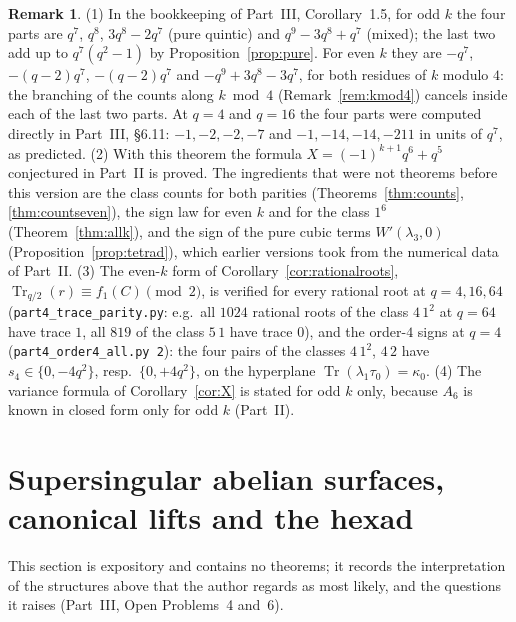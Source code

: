 \documentclass[12pt,a4paper]{amsart}
\theoremstyle{definition}
\newtheorem{remark}[theorem]{Remark}
\newcommand{\Tr}{\operatorname{Tr}}
\begin{document}
\begin{remark}
(1) In the bookkeeping of Part~III, Corollary~1.5, for odd $k$ the four parts are $q^7$, $q^8$, $3q^8-2q^7$ (pure quintic) and $q^9-3q^8+q^7$ (mixed); the last two add up to $q^7(q^2-1)$ by Proposition~\ref{prop:pure}. For even $k$ they are $-q^7$, $-(q-2)q^7$, $-(q-2)q^7$ and $-q^9+3q^8-3q^7$, for both residues of $k$ modulo $4$: the branching of the counts along $k\bmod4$ (Remark~\ref{rem:kmod4}) cancels inside each of the last two parts. At $q=4$ and $q=16$ the four parts were computed directly in Part~III, \S6.11: $-1,-2,-2,-7$ and $-1,-14,-14,-211$ in units of $q^7$, as predicted. (2) With this theorem the formula $X=(-1)^{k+1}q^6+q^5$ conjectured in Part~II is proved. The ingredients that were not theorems before this version are the class counts for both parities (Theorems~\ref{thm:counts}, \ref{thm:countseven}), the sign law for even $k$ and for the class $1^6$ (Theorem~\ref{thm:allk}), and the sign of the pure cubic terms $W'(\lambda_3,0)$ (Proposition~\ref{prop:tetrad}), which earlier versions took from the numerical data of Part~II. (3) The even-$k$ form of Corollary~\ref{cor:rationalroots}, $\Tr_{q/2}(r)\equiv f_1(C)\pmod2$, is verified for every rational root at $q=4,16,64$ (\texttt{part4\_trace\_parity.py}: e.g.\ all $1024$ rational roots of the class $4\,1^2$ at $q=64$ have trace $1$, all $819$ of the class $5\,1$ have trace $0$), and the order-$4$ signs at $q=4$ (\texttt{part4\_order4\_all.py 2}): the four pairs of the classes $4\,1^2$, $4\,2$ have $s_4\in\{0,-4q^2\}$, resp.\ $\{0,+4q^2\}$, on the hyperplane $\Tr(\lambda_1\tau_0)=\kappa_0$. (4) The variance formula of Corollary~\ref{cor:X} is stated for odd $k$ only, because $A_6$ is known in closed form only for odd $k$ (Part~II).
\end{remark}

\section{Supersingular abelian surfaces, canonical lifts and the hexad}\label{sec:lifts}
This section is expository and contains no theorems; it records the interpretation of the structures above that the author regards as most likely, and the questions it raises (Part~III, Open Problems~4 and~6).
\end{document}
